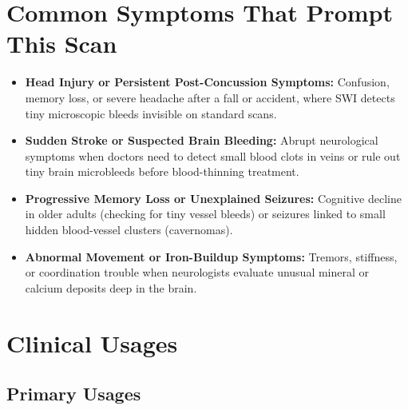 \section{Common Symptoms That Prompt This Scan}
\begin{itemize}
    \item \textbf{Head Injury or Persistent Post-Concussion Symptoms:} Confusion, memory loss, or severe headache after a fall or accident, where SWI detects tiny microscopic bleeds invisible on standard scans.
    \item \textbf{Sudden Stroke or Suspected Brain Bleeding:} Abrupt neurological symptoms when doctors need to detect small blood clots in veins or rule out tiny brain microbleeds before blood-thinning treatment.
    \item \textbf{Progressive Memory Loss or Unexplained Seizures:} Cognitive decline in older adults (checking for tiny vessel bleeds) or seizures linked to small hidden blood-vessel clusters (cavernomas).
    \item \textbf{Abnormal Movement or Iron-Buildup Symptoms:} Tremors, stiffness, or coordination trouble when neurologists evaluate unusual mineral or calcium deposits deep in the brain.
\end{itemize}

\section{Clinical Usages}

\subsection{Primary Usages}

